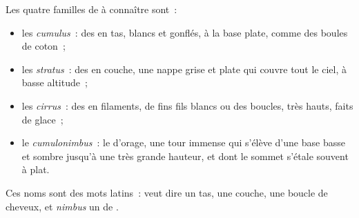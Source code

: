 \begin{definition}\label{def:g4:clouds-rain-snow:cloud-families}
Les quatre familles de  à connaître sont~:
\begin{itemize}
  \item les \emph{cumulus}~: des  en tas, blancs et
        gonflés, à la base plate, comme des boules de coton~;
  \item les \emph{stratus}~: des  en couche, une nappe
        grise et plate qui couvre tout le ciel, à basse altitude~;
  \item les \emph{cirrus}~: des  en filaments, de
        fins fils blancs ou des boucles, très hauts, faits de glace~;
  \item le \emph{cumulonimbus}~: le  d'orage, une
        tour immense qui s'élève d'une base basse et sombre jusqu'à une très
        grande hauteur, et dont le sommet s'étale souvent à plat.
\end{itemize}
\end{definition}

Ces noms sont des mots latins~: \emph{} veut dire un tas,
\emph{} une couche, \emph{} une boucle de cheveux, et
\emph{nimbus} un  de .

